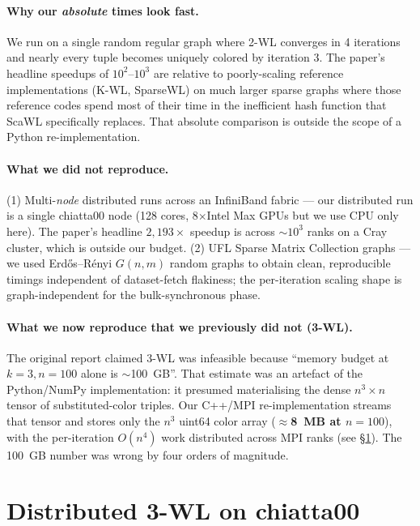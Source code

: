\documentclass[11pt]{article}
\begin{document}
\paragraph{Why our \emph{absolute} times look fast.} We run on a single random regular graph where 2-WL converges in 4 iterations and nearly every tuple becomes uniquely colored by iteration 3. The paper's headline speedups of $10^2$--$10^3$ are relative to poorly-scaling reference implementations (K-WL, SparseWL) on much larger sparse graphs where those reference codes spend most of their time in the inefficient hash function that ScaWL specifically replaces. That absolute comparison is outside the scope of a Python re-implementation.
\paragraph{What we did not reproduce.} (1) Multi-\emph{node} distributed runs across an InfiniBand fabric --- our distributed run is a single chiatta00 node (128 cores, 8$\times$Intel Max GPUs but we use CPU only here). The paper's headline $2{,}193\times$ speedup is across $\sim$$10^3$ ranks on a Cray cluster, which is outside our budget. (2) UFL Sparse Matrix Collection graphs --- we used Erd\H{o}s--R\'enyi $G(n,m)$ random graphs to obtain clean, reproducible timings independent of dataset-fetch flakiness; the per-iteration scaling shape is graph-independent for the bulk-synchronous phase.

\paragraph{What we now reproduce that we previously did not (3-WL).} The original report claimed 3-WL was infeasible because ``memory budget at $k{=}3, n{=}100$ alone is $\sim$100~GB''. That estimate was an artefact of the Python/NumPy implementation: it presumed materialising the dense $n^3 \times n$ tensor of substituted-color triples. Our C++/MPI re-implementation streams that tensor and stores only the $n^3$ uint64 color array (\textbf{$\approx$8~MB at $n{=}100$}), with the per-iteration $O(n^4)$ work distributed across MPI ranks (see \S\ref{sec:dist3wl}). The 100~GB number was wrong by four orders of magnitude.

\section{Distributed 3-WL on chiatta00}\label{sec:dist3wl}
\end{document}
